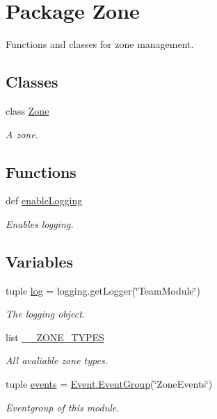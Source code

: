 \hypertarget{namespace_zone}{
\section{Package Zone}
\label{namespace_zone}
}


Functions and classes for zone management.  


\subsection*{Classes}
\begin{DoxyCompactItemize}
\item 
class \hyperlink{class_zone_1_1_zone}{Zone}
\begin{DoxyCompactList}\small\item\em A zone. \item\end{DoxyCompactList}\end{DoxyCompactItemize}
\subsection*{Functions}
\begin{DoxyCompactItemize}
\item 
def \hyperlink{namespace_zone_aaa40a627f781a072131be03ac8e08328}{enableLogging}
\begin{DoxyCompactList}\small\item\em Enables logging. \item\end{DoxyCompactList}\end{DoxyCompactItemize}
\subsection*{Variables}
\begin{DoxyCompactItemize}
\item 
tuple \hyperlink{namespace_zone_aad90704d2c88929bd92b7acf2b9a09d6}{log} = logging.getLogger(\char`\"{}TeamModule\char`\"{})
\begin{DoxyCompactList}\small\item\em The logging object. \item\end{DoxyCompactList}\item 
list \hyperlink{namespace_zone_a66957733c79b90d78a2f4760d501bba6}{\_\-\_\-ZONE\_\-TYPES}
\begin{DoxyCompactList}\small\item\em All avaliable zone types. \item\end{DoxyCompactList}\item 
tuple \hyperlink{namespace_zone_a2cf3edd088ca6482872ba018b81ef52a}{events} = \hyperlink{class_event_1_1_event_group}{Event.EventGroup}(\char`\"{}ZoneEvents\char`\"{})
\begin{DoxyCompactList}\small\item\em Eventgroup of this module. \item\end{DoxyCompactList}\end{DoxyCompactItemize}



